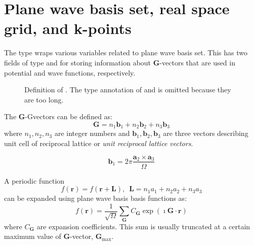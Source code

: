 \section{Plane wave basis set, real space grid, and k-points}

The type  wraps various variables related to plane wave basis
set. This has two fields of type 
and  for storing information about $\mathbf{G}$-vectors
that are used in potential and wave functions, respectively.

\begin{figure}[H]
\centering
{}
\caption{Definition of . The type annotation of  and  is
omitted because they are too long.}
\end{figure}

The $\mathbf{G}$-Gvectors can be defined as:
\begin{equation}
\mathbf{G} = n_1 \mathbf{b}_1 + n_2 \mathbf{b}_2 + n_3 \mathbf{b}_3
\end{equation}
where $n_1, n_2, n_3$ are integer numbers and
$\mathbf{b}_1, \mathbf{b}_2, \mathbf{b}_3$ are three vectors describing
unit cell of reciprocal lattice or \textit{unit reciprocal lattice vectors}.

\begin{equation}
\mathbf{b}_1 = 2\pi\frac{\mathbf{a}_{2} \times \mathbf{a}_{3}}{\Omega}
\end{equation}

A periodic function
\begin{equation}
f(\mathbf{r}) = f(\mathbf{r}+\mathbf{L}),\,\,\,
\mathbf{L} = n_{1}a_{1} + n_{2}a_{2} + n_{3}a_{3}
\end{equation}
can be expanded using plane wave basis basis functions as:
\begin{equation}
f(\mathbf{r}) = \frac{1}{\sqrt{\Omega}}\sum_{\mathbf{G}}
C_{\mathbf{G}} \exp(\imath \mathbf{G} \cdot \mathbf{r})
\end{equation}
where $C_{\mathbf{G}}$ are expansion coefficients. This sum is usually truncated
at a certain maximum value of $\mathbf{G}$-vector, $\mathbf{G}_{\mathrm{max}}$.

